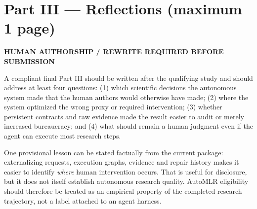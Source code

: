 \documentclass{article}
\begin{document}
\newpage
\section*{Part III --- Reflections (maximum 1 page)}
\begin{center}\textbf{HUMAN AUTHORSHIP / REWRITE REQUIRED BEFORE SUBMISSION}\end{center}
A compliant final Part III should be written after the qualifying study and should address at least four questions: (1) which scientific decisions the autonomous system made that the human authors would otherwise have made; (2) where the system optimized the wrong proxy or required intervention; (3) whether persistent contracts and raw evidence made the result easier to audit or merely increased bureaucracy; and (4) what should remain a human judgment even if the agent can execute most research steps.

One provisional lesson can be stated factually from the current package: externalizing requests, execution graphs, evidence and repair history makes it easier to identify \emph{where} human intervention occurs. That is useful for disclosure, but it does not itself establish autonomous research quality. AutoMLR eligibility should therefore be treated as an empirical property of the completed research trajectory, not a label attached to an agent harness.



\end{document}
